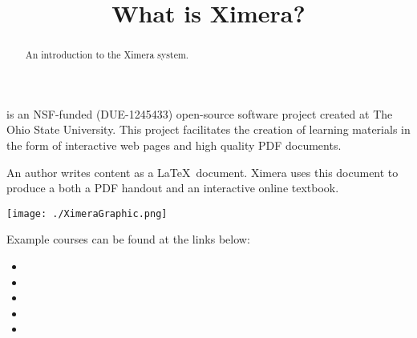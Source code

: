 \documentclass{ximera}
\title{What is Ximera?}
\begin{document}
\begin{abstract}
An introduction to the Ximera system.
\end{abstract}
\maketitle


 is an NSF-funded (DUE-1245433)
open-source software project created at The Ohio State
University. This project facilitates the creation of learning
materials in the form of interactive web pages and high quality PDF
documents.

An author writes content as a \LaTeX\ document.  Ximera uses this
document to produce a both a PDF handout and an interactive online
textbook.

\begin{image}
\texttt{[image: ./XimeraGraphic.png]}
\end{image}


Example courses can be found at the links below:

\begin{itemize}
\item {}
\item {}
\item {}
\item {}
\item {}
  
\end{itemize}
\end{document}
